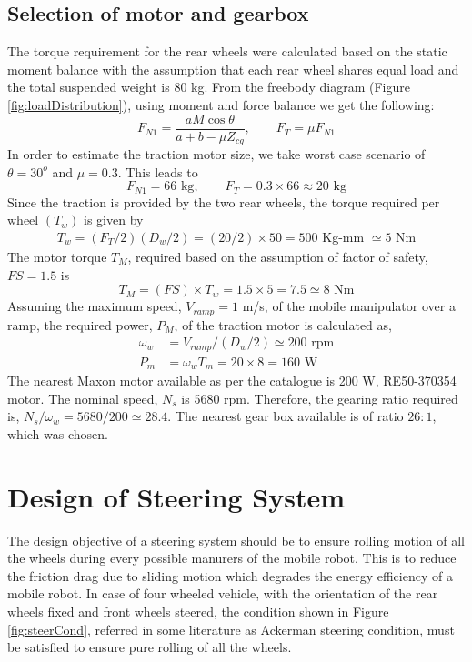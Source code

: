  \subsection {Selection of motor and gearbox}
 The torque requirement for the rear wheels were calculated based on the static moment balance with the assumption that each rear wheel shares equal load and the total suspended weight is 80 kg. From the freebody diagram (Figure   \ref{fig:loadDistribution}), using moment and force balance  we get the following:
\begin{equation}
\label{eqn:t1}
F_{N1}=\frac{a M \cos \theta}{a+b-\mu Z_{cg}} , \quad \quad
F_T=\mu F_{N1}
\end{equation}
In order to estimate the traction motor size, we take worst case scenario of $\theta=30^o$ and $\mu =0.3$. This leads to
\begin{equation*}
F_{N1}=66 \text{ kg}, \quad\quad F_T=0.3\times 66 \approx 20 \text{ kg}
\end{equation*}
 Since the traction is provided by the two rear wheels, the torque required per wheel $(T_w)$ is given by
\begin{eqnarray}
T_w=(F_T/2)(D_w/2)= (20/2) \times 50=500 \text{ Kg-mm } \simeq 5 \text{ Nm}
\end{eqnarray}
The motor torque $T_M$, required based on the assumption of factor of safety, $FS=1.5$ is
\begin{equation}
T_M=(FS)\times T_w=1.5\times 5 =7.5 \simeq 8 \text{ Nm}
\end{equation}
 Assuming the maximum speed, $V_{ramp}=1$ m/s, of the mobile manipulator over a ramp, the required power, $P_M$, of the traction motor is calculated as,
 \begin{equation}
 \begin{aligned}
\omega_w&=V_{ramp}/(D_w/2) \simeq 200 \text{ rpm}\\
P_m&=\omega_w T_m=20\times 8=160 \text{ W}
 \end{aligned}
 \end{equation}
 The nearest Maxon motor available as per the catalogue \cite{catMaxon} is 200 W,  RE50-370354 motor.  The nominal speed, $N_s$ is 5680 rpm. Therefore, the  gearing  ratio required is, $N_s/\omega_w=5680/200 \simeq 28.4$. The nearest gear box available  is of ratio $26:1$, which was chosen. 

\section{Design of Steering System }
The design objective of a steering system should be to ensure rolling motion of all the  wheels during every possible manurers of the mobile robot. This is  to reduce the friction drag due to sliding motion which degrades the energy efficiency of a mobile robot. In case of four wheeled vehicle, with the orientation of the rear wheels fixed and front wheels steered, the condition   shown in Figure \ref{fig:steerCond},  referred in some literature as Ackerman steering condition, must be satisfied to ensure pure rolling of all the wheels.   

